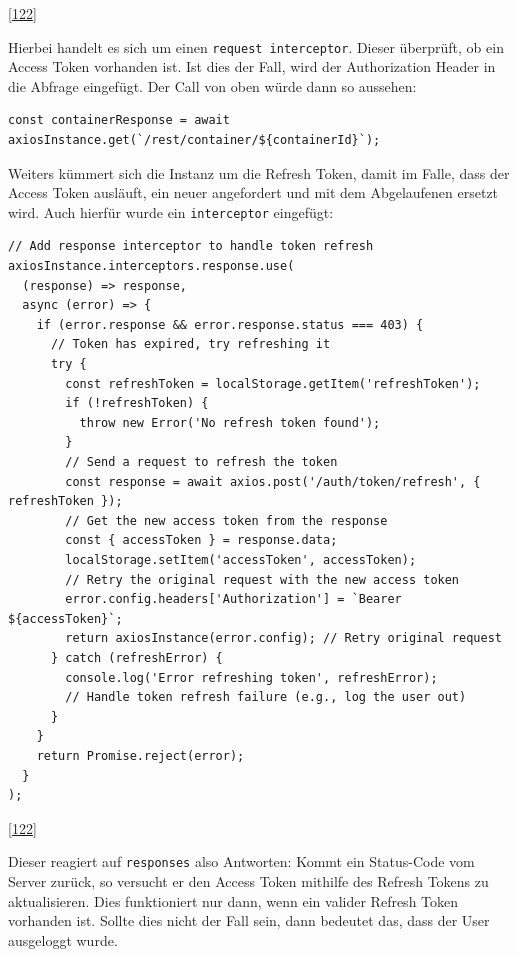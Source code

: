 \documentclass[
    headings=optiontotocandhead,%
    twoside,
    numbers=noenddot,%
    12pt, %
    titlepage, %
    parskip=full, %
    listof=leveldown, 
    numbers=noenddot, %
    a4paper,DIV=14,
    BCOR=15mm,
]{scrbook}
\newcommand{\passthrough}[1]{#1}
\begin{document}
{[}\protect\hyperlink{ref-gpt-AxiosInterceptors}{122}{]}

Hierbei handelt es sich um einen
\passthrough{\lstinline!request interceptor!}. Dieser überprüft, ob ein
Access Token vorhanden ist. Ist dies der Fall, wird der Authorization
Header in die Abfrage eingefügt. Der Call von oben würde dann so
aussehen:

\begin{lstlisting}[caption={Rest Call mit der Axios Instanz + Interceptor}]
const containerResponse = await axiosInstance.get(`/rest/container/${containerId}`);
\end{lstlisting}

Weiters kümmert sich die Instanz um die Refresh Token, damit im Falle,
dass der Access Token ausläuft, ein neuer angefordert und mit dem
Abgelaufenen ersetzt wird. Auch hierfür wurde ein
\passthrough{\lstinline!interceptor!} eingefügt:

\begin{lstlisting}[caption={Erweiterung der Axios Instanz mit response-Interceptor}]
// Add response interceptor to handle token refresh
axiosInstance.interceptors.response.use(
  (response) => response,
  async (error) => {
    if (error.response && error.response.status === 403) {
      // Token has expired, try refreshing it
      try {
        const refreshToken = localStorage.getItem('refreshToken');
        if (!refreshToken) {
          throw new Error('No refresh token found');
        }
        // Send a request to refresh the token
        const response = await axios.post('/auth/token/refresh', { refreshToken });
        // Get the new access token from the response
        const { accessToken } = response.data;
        localStorage.setItem('accessToken', accessToken);
        // Retry the original request with the new access token
        error.config.headers['Authorization'] = `Bearer ${accessToken}`;
        return axiosInstance(error.config); // Retry original request
      } catch (refreshError) {
        console.log('Error refreshing token', refreshError);
        // Handle token refresh failure (e.g., log the user out)
      }
    }
    return Promise.reject(error);
  }
);
\end{lstlisting}

{[}\protect\hyperlink{ref-gpt-AxiosInterceptors}{122}{]}

Dieser reagiert auf \passthrough{\lstinline!responses!} also Antworten:
Kommt ein Status-Code vom Server zurück, so versucht er den Access Token
mithilfe des Refresh Tokens zu aktualisieren. Dies funktioniert nur
dann, wenn ein valider Refresh Token vorhanden ist. Sollte dies nicht
der Fall sein, dann bedeutet das, dass der User ausgeloggt wurde.
\end{document}
